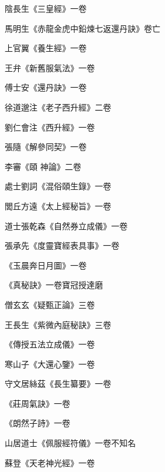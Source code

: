 \begin{pinyinscope}
 陰長生《三皇經》一卷



 馬明生《赤龍金虎中鉛煉七返還丹訣》卷亡



 上官翼《養生經》一卷



 王弁《新舊服氣法》一卷



 傅士安《還丹訣》一卷



 徐道邈注《老子西升經》二卷



 劉仁會注《西升經》一卷



 張隨《解參同契》一卷



 李審《頤
 神論》二卷



 處士劉詞《混俗頤生錄》一卷



 閭丘方遠《太上經秘旨》一卷



 道士張乾森《自然券立成儀》一卷



 張承先《度靈寶經表具事》一卷



 《玉晨奔日月圖》一卷



 《真秘訣》一卷寶冠授達磨



 僧玄玄《疑甄正論》三卷



 王長生《紫微內庭秘訣》三卷



 《傳授五法立成儀》一卷



 寒山子《大還心鑒》一卷



 守文居絲茲《長生纂要》一卷



 《莊周氣訣》一卷



 《朗然子詩》一卷



 山居道士《佩服經符儀》一卷不知名



 蘇登《天老神光經》一卷




\end{pinyinscope}
